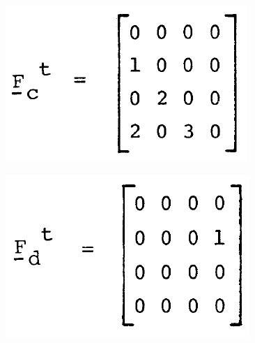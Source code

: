 \documentclass[12pt,a4paper]{article}
\begin{document}
\begin{enumerate}
		\begin{figure}[H]
			\centering
			\includegraphics[width=0.2\linewidth]{img/img08}
		\end{figure}
	
		\begin{figure}[H]
			\centering
			\includegraphics[width=0.2\linewidth]{img/img09}
		\end{figure}
	\end{enumerate}
\end{document}
